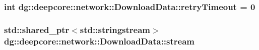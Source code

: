 \subsubsection[{\texorpdfstring{retry\+Timeout}{retryTimeout}}]{\setlength{\rightskip}{0pt plus 5cm}int dg\+::deepcore\+::network\+::\+Download\+Data\+::retry\+Timeout = 0}\hypertarget{structdg_1_1deepcore_1_1network_1_1_download_data_a0a96bb4e087ff085407a3a19ff5716d7}{}\label{structdg_1_1deepcore_1_1network_1_1_download_data_a0a96bb4e087ff085407a3a19ff5716d7}
\subsubsection[{\texorpdfstring{stream}{stream}}]{\setlength{\rightskip}{0pt plus 5cm}std\+::shared\+\_\+ptr$<$std\+::stringstream$>$ dg\+::deepcore\+::network\+::\+Download\+Data\+::stream}\hypertarget{structdg_1_1deepcore_1_1network_1_1_download_data_a61ed861cdbff07ed7c03f456b6ab5053}{}\label{structdg_1_1deepcore_1_1network_1_1_download_data_a61ed861cdbff07ed7c03f456b6ab5053}
